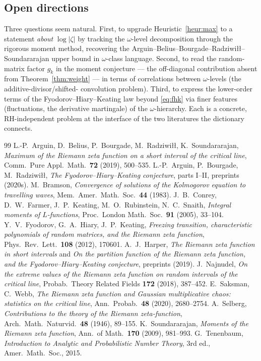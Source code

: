 \documentclass[11pt]{amsart}
\theoremstyle{definition}
\begin{document}
\subsection{Open directions}
Three questions seem natural. First, to upgrade Heuristic~\ref{heur:max} to a statement \emph{about} $\log|\zeta|$
by tracking the $\omega$-level decomposition through the rigorous moment method, recovering the
Arguin--Belius--Bourgade--Radziwi{\l}{\l}--Soundararajan upper bound in $\omega$-class language. Second, to read
the random-matrix factor $g_k$ in the moment conjecture --- the off-diagonal contribution absent from
Theorem~\ref{thm:weight} --- in terms of correlations between $\omega$-levels (the additive-divisor/shifted-
convolution problem). Third, to express the lower-order terms of the Fyodorov--Hiary--Keating law beyond
\eqref{eq:fhk} via finer features (fluctuations, the derivative martingale) of the $\omega$-hierarchy. Each is a
concrete, RH-independent problem at the interface of the two literatures the dictionary connects.

\begin{thebibliography}{99}
 L.-P.~Arguin, D.~Belius, P.~Bourgade, M.~Radziwi{\l}{\l}, K.~Soundararajan,
\emph{Maximum of the Riemann zeta function on a short interval of the critical line},
Comm.\ Pure Appl.\ Math.\ \textbf{72} (2019), 500--535.
 L.-P.~Arguin, P.~Bourgade, M.~Radziwi{\l}{\l},
\emph{The Fyodorov--Hiary--Keating conjecture}, parts I--II, preprints (2020s).
 M.~Bramson, \emph{Convergence of solutions of the Kolmogorov equation to travelling waves},
Mem.\ Amer.\ Math.\ Soc.\ \textbf{44} (1983).
 J.~B.~Conrey, D.~W.~Farmer, J.~P.~Keating, M.~O.~Rubinstein, N.~C.~Snaith,
\emph{Integral moments of $L$-functions}, Proc.\ London Math.\ Soc.\ \textbf{91} (2005), 33--104.
 Y.~V.~Fyodorov, G.~A.~Hiary, J.~P.~Keating,
\emph{Freezing transition, characteristic polynomials of random matrices, and the Riemann zeta function},
Phys.\ Rev.\ Lett.\ \textbf{108} (2012), 170601.
 A.~J.~Harper, \emph{The Riemann zeta function in short intervals} and
\emph{On the partition function of the Riemann zeta function, and the Fyodorov--Hiary--Keating conjecture},
preprints (2019).
 J.~Najnudel, \emph{On the extreme values of the Riemann zeta function on random intervals of
the critical line}, Probab.\ Theory Related Fields \textbf{172} (2018), 387--452.
 E.~Saksman, C.~Webb, \emph{The Riemann zeta function and Gaussian multiplicative chaos:
statistics on the critical line}, Ann.\ Probab.\ \textbf{48} (2020), 2680--2754.
 A.~Selberg, \emph{Contributions to the theory of the Riemann zeta-function},
Arch.\ Math.\ Naturvid.\ \textbf{48} (1946), 89--155.
 K.~Soundararajan, \emph{Moments of the Riemann zeta function},
Ann.\ of Math.\ \textbf{170} (2009), 981--993.
 G.~Tenenbaum, \emph{Introduction to Analytic and Probabilistic Number Theory},
3rd ed., Amer.\ Math.\ Soc., 2015.
\end{thebibliography}
\end{document}
